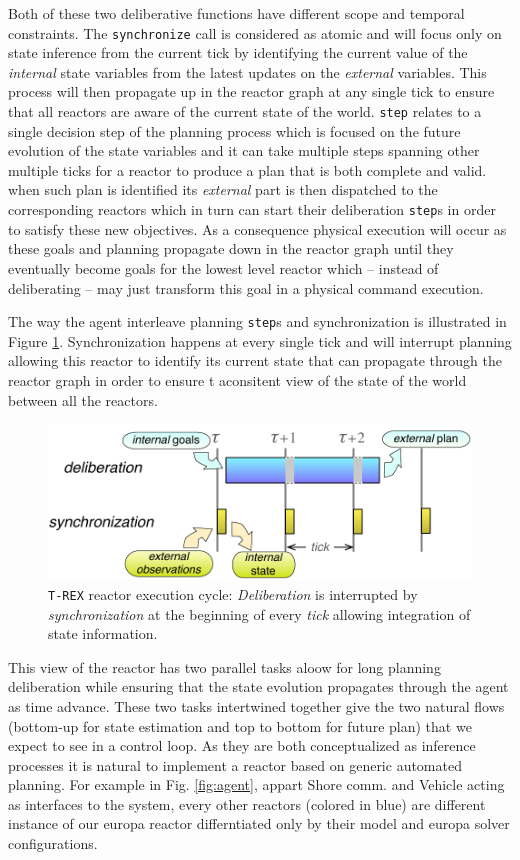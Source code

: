 Both of these two deliberative functions have different scope and
temporal constraints. The \texttt{synchronize} call is considered as
atomic and will focus only on state inference from the current tick by
identifying the current value of the {\em internal} state variables
from the latest updates on the {\em external} variables. This process
will then propagate up in the reactor graph at any single tick to
ensure that all reactors are aware of the current state of the
world. \texttt{step} relates to a single decision step of the planning
process which is focused on the future evolution of the state
variables and it can take multiple steps spanning other multiple ticks
for a reactor to produce a plan that is both complete and valid. when
such plan is identified its {\em external} part is then dispatched to
the corresponding reactors which in turn can start their deliberation
\texttt{step}s in order to satisfy these new objectives. As a
consequence physical execution will occur as these goals and planning
propagate down in the reactor graph until they eventually become goals
for the lowest level reactor which -- instead of deliberating -- may
just transform this goal in a physical command execution.

The way the agent interleave planning \texttt{step}s and
synchronization is illustrated in Figure \ref{fig:tick-exec}.
Synchronization happens at every single tick and will interrupt
planning allowing this reactor to identify its current state that can
propagate through the reactor graph in order to ensure t aconsitent
view of the state of the world between all the reactors.  

\begin{figure}[!htbp]
  \centering
  \vskip-1pc
  \includegraphics[width=0.55\columnwidth]{figs/tick-cycle}
  \caption{\small \texttt{T-REX} reactor execution cycle: {\em
      Deliberation} is interrupted by {\em synchronization} at the
    beginning of every {\em tick} allowing integration of state
    information.}
  \label{fig:tick-exec}
  \vskip-0.8pc
\end{figure}

This view of the reactor has two parallel tasks aloow for long
planning deliberation while ensuring that the state evolution
propagates through the agent as time advance. These two tasks 
intertwined together give the two natural flows (bottom-up for state
estimation and top to bottom for future plan) that we expect to see in
a control loop. As they are both conceptualized as inference processes
it is natural to implement a reactor based on generic automated
planning. For example in Fig. \ref{fig:agent}, appart \textsf{Shore
  comm.} and \textsf{Vehicle} acting as interfaces to the system,
every other reactors (colored in blue) are different instance of our
europa reactor differntiated only by their model and europa solver
configurations. 

